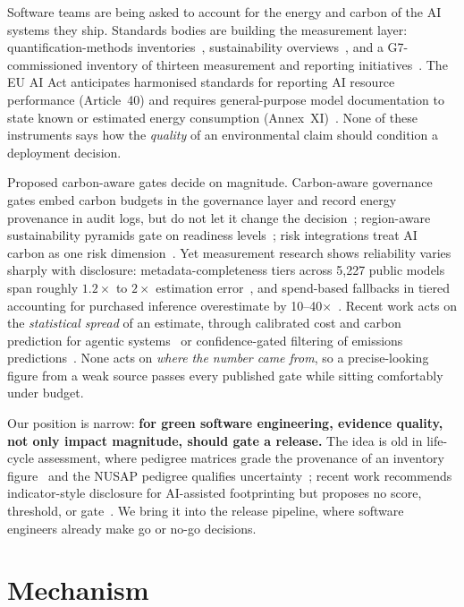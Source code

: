 \documentclass[10pt,conference]{IEEEtran}
\begin{document}
Software teams are being asked to account for the energy and carbon of the AI
systems they ship. Standards bodies are building the measurement layer:
quantification-methods inventories~\cite{cen18145}, sustainability
overviews~\cite{iso20226}, and a G7-commissioned inventory of thirteen
measurement and reporting initiatives~\cite{g7}. The EU AI Act anticipates
harmonised standards for reporting AI resource performance (Article~40) and
requires general-purpose model documentation to state known or estimated energy
consumption (Annex~XI)~\cite{aiact,ebert}. None of these instruments says how
the \emph{quality} of an environmental claim should condition a deployment
decision.

Proposed carbon-aware gates decide on magnitude. Carbon-aware governance gates
embed carbon budgets in the governance layer and record energy provenance in
audit logs, but do not let it change the decision~\cite{cagg}; region-aware
sustainability pyramids gate on readiness levels~\cite{gtrace}; risk
integrations treat AI carbon as one risk dimension~\cite{tkachenko}. Yet
measurement research shows reliability varies sharply with disclosure:
metadata-completeness tiers across 5{,}227 public models span roughly
$1.2\times$ to $2\times$ estimation error~\cite{huggingcarbon}, and spend-based
fallbacks in tiered accounting for purchased inference overestimate by
10--40$\times$~\cite{scope3}. Recent work acts on the \emph{statistical spread}
of an estimate, through calibrated cost and carbon prediction for agentic
systems~\cite{greensarc} or confidence-gated filtering of emissions
predictions~\cite{trustpems}. None acts on \emph{where the number came from}, so
a precise-looking figure from a weak source passes every published gate while
sitting comfortably under budget.

Our position is narrow: \textbf{for green software engineering, evidence
quality, not only impact magnitude, should gate a release.} The idea is old in
life-cycle assessment, where pedigree matrices grade the provenance of an
inventory figure~\cite{weidema} and the NUSAP pedigree qualifies
uncertainty~\cite{nusap}; recent work recommends indicator-style disclosure for
AI-assisted footprinting but proposes no score, threshold, or
gate~\cite{credible}. We bring it into the release pipeline, where software
engineers already make go or no-go decisions.

\section{Mechanism}
\end{document}
